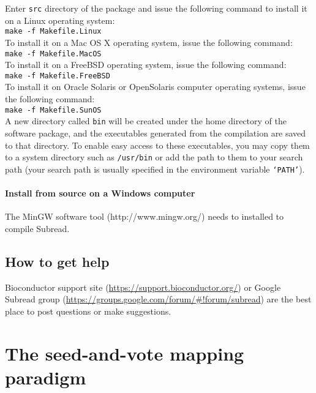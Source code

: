 \documentclass[12pt]{report}
\newcommand{\code}[1]{{\small\texttt{#1}}}
\begin{document}
Enter \code{src} directory of the package and issue the following command to install it on a Linux operating system: \\

\code{make -f Makefile.Linux}\\

To install it on a Mac OS X operating system, issue the following command:\\

\code{make -f Makefile.MacOS}\\

To install it on a FreeBSD operating system, issue the following command:\\

\code{make -f Makefile.FreeBSD}\\

To install it on Oracle Solaris or OpenSolaris computer operating systems, issue the following command:\\

\code{make -f Makefile.SunOS}\\

A new directory called \code{bin} will be created under the home directory of the software package, and the executables generated from the compilation are saved to that directory.
To enable easy access to these executables, you may copy them to a system directory such as \code{/usr/bin} or add the path to them to your search path (your search path is usually specified in the environment variable \code{`PATH'}).

\subsubsection{Install from source on a Windows computer}

The MinGW software tool  (http://www.mingw.org/) needs to installed to compile Subread.

\section{How to get help}

Bioconductor support site (\url{https://support.bioconductor.org/}) or Google Subread group (\url{https://groups.google.com/forum/#!forum/subread}) are the best place to post questions or make suggestions.


\chapter{The seed-and-vote mapping paradigm}
\end{document}
